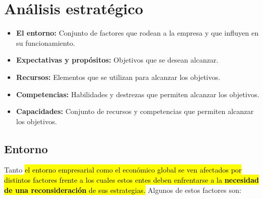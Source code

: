 \documentclass{templateNote}
\newcommand{\hlcolor}[2]{{\sethlcolor{#1}\hl{#2}}}
\begin{document}
\newpage
\section{Análisis estratégico}\label{sec:analisisEstrategico}
\begin{itemize}
    \item \textbf{El entorno:} Conjunto de factores que rodean a la empresa y que influyen en su funcionamiento.
    
    \item \textbf{Expectativas y propósitos:} Objetivos que se desean alcanzar.
    
    \item \textbf{Recursos:} Elementos que se utilizan para alcanzar los objetivos.
    
    \item \textbf{Competencias:} Habilidades y destrezas que permiten alcanzar los objetivos.
    
    \item \textbf{Capacidades:} Conjunto de recursos y competencias que permiten alcanzar los objetivos.
\end{itemize}

\subsection{Entorno}\label{subsec:entorno}
\noindent Tanto \hlcolor{Celeste!30!white}{el entorno empresarial como el económico global se ven afectados por distintos factores frente a los cuales estos entes deben enfrentarse a la \textbf{necesidad de una reconsideración} de sus estrategias.} Algunos de estos factores son:
\end{document}
